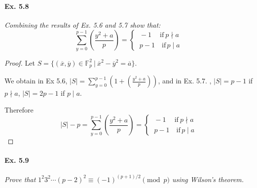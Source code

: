 \documentclass[11pt,a4paper]{article}
\newcommand{\F}{\mathbb{F}}
\newcommand{\legendre}[2]{\genfrac{(}{)}{}{}{#1}{#2}}
\begin{document}
\paragraph{Ex. 5.8}

{\it Combining the results of Ex. 5.6 and 5.7 show that:
$$
  \sum_{y=0}^{p-1} \left(\frac{y^2 +a}{p}\right) =
  \begin{cases}
   \  -1 \ \quad \mathrm {if}\ p\nmid a \\
   \  p-1 \quad \mathrm{if}\, p \mid a
  \end{cases}
$$
}

\begin{proof}
Let $S =\{(\overline{x},\overline{y}) \in \F_p^2\ \vert \ \overline{x}^2 - \overline{y}^2 = \overline{a}\} $.

We obtain in Ex 5.6, $\vert S \vert =    \sum\limits_{y=0}^{p-1}\left(1+\legendre{y^2 + a}{p}\right)$, and in Ex. 5.7. , $\vert S \vert  =  p-1$ if $p\nmid a$, $\vert S \vert  =  2p-1$ if $p\mid a$.

Therefore $$|S| - p = \sum\limits_{y=0}^{p-1} \legendre{y^2 + a}{p} = 
 \begin{cases}
   \  -1 \ \quad \mathrm {if}\ p\nmid a \\
   \  p-1 \quad \mathrm{if}\, p \mid a
  \end{cases}
  $$
\end{proof}

\paragraph{Ex. 5.9}

{\it  Prove that $1^2 3^2 \cdots (p-2)^2 \equiv (-1)^{(p+1)/2} \pmod p$ using Wilson's theorem.
}
\end{document}
